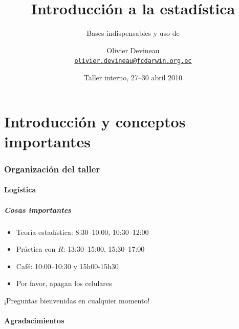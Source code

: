 \documentclass[mathserif]{beamer}
\title[Introducci\'on a la estad\'istica]{Introducci\'on a la estad\'istica}
\subtitle[Bases indispensables y uso de R]{Bases indispensables y uso de \Rlogo}
\author[]{Olivier Devineau \\ \href{mailto:olivier.devineau@fcdarwin.org.ec}{\texttt{\small olivier.devineau@fcdarwin.org.ec} } }
\institute[]{Fundaci\'on Charles Darwin}
\date[Version courte]{Taller interno, 27--30 abril 2010}%
\begin{document}
\begin{frame}[label=title]
  \titlepage
\end{frame}%





\part[Introducci\'on]{Introducci\'on y conceptos importantes}



  
\section*{Organizaci\'on del taller}

\subsection*{Log\'istica}

\begin{frame}[label=admin]
  \frametitle{Cosas importantes}
  \begin{itemize}
    \item Teor\'ia estad\'istica: {\small 8:30--10:00, 10:30--12:00}
    \item Pr\'actica con $R$: {\small 13:30--15:00, 15:30--17:00}
    \item Caf\'e: {\small 10:00--10:30 y 15h00-15h30}
    \item Por favor, apagan los celulares
  \end{itemize}
  \begin{block}{}
    \begin{center}
      ¡Preguntas bienvenidas en cualquier momento!
    \end{center}
  \end{block}
\end{frame}%


\subsection*{Agradacimientos}
\end{document}
